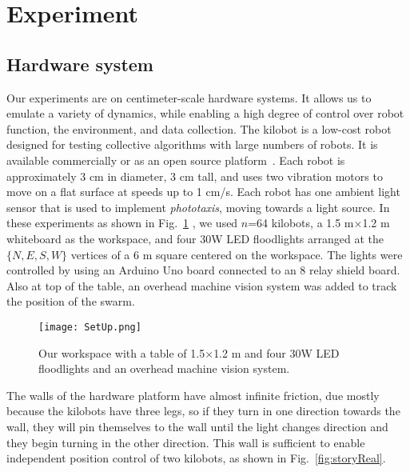 
\section{Experiment}\label{sec:expResults}



\subsection{Hardware system}


Our experiments are on centimeter-scale hardware systems.  It allows us to emulate a variety of dynamics, while enabling a high degree of control over robot function, the environment, and data collection. The kilobot \cite{Rubenstein2012,rubenstein2014programmable} is a low-cost robot designed for testing collective algorithms with large numbers of robots. It is available commercially or as an open source platform~\cite{K-Team2015}.  Each robot is approximately 3 cm in diameter, 3 cm tall, and uses two vibration motors to move on a flat surface at speeds up to 1 cm/s.  Each robot has one ambient light sensor that is used to implement \emph{phototaxis},  moving towards a light source. 
In these experiments as shown in Fig.~\ref{fig:setup} , we used $n$=64 kilobots, a 1.5 m$\times$1.2 m whiteboard as the workspace, and four 30W LED floodlights arranged at the $\{N,E,S,W\}$ vertices of a 6 m square centered on the workspace. The lights were controlled by using an Arduino Uno board connected to an 8 relay shield board. Also at top of the table, an overhead machine vision system was added to track the position of the swarm.

\begin{figure}
\begin{center}
	\texttt{[image: SetUp.png]}
\end{center}
\caption{\label{fig:setup}
Our workspace with a table of 1.5$\times$1.2 m and four 30W LED floodlights and an overhead machine vision system.
}
\end{figure}

The walls of the hardware platform have almost infinite friction, due mostly because the kilobots have three legs, so if they turn in one direction towards the wall, they will pin themselves to the wall until the light changes direction and they begin turning in the other direction.  This wall is sufficient to enable independent position control of two kilobots, as shown in Fig.~\ref{fig:storyReal}.



